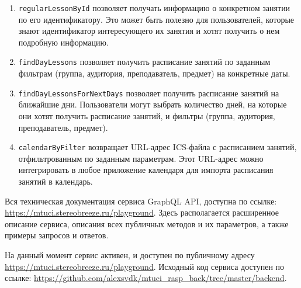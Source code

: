\begin{enumerate}
\item \texttt{regularLessonById} позволяет получать информацию о конкретном занятии по его идентификатору. Это может быть полезно для пользователей, которые знают идентификатор интересующего их занятия и хотят получить о нем подробную информацию.
\item \texttt{findDayLessons} позволяет получить расписание занятий по заданным фильтрам (группа, аудитория, преподаватель, предмет) на конкретные даты.
\item \texttt{findDayLessonsForNextDays} позволяет получить расписание занятий на ближайшие дни. Пользователи могут выбрать количество дней, на которые они хотят получить расписание занятий, и фильтры (группа, аудитория, преподаватель, предмет).
\item \texttt{calendarByFilter} возвращает URL-адрес ICS-файла с расписанием занятий, отфильтрованным по заданным параметрам. Этот URL-адрес можно интегрировать в любое приложение календаря для импорта расписания занятий в календарь.
\end{enumerate}

Вся техническая документация сервиса GraphQL API, доступна по ссылке:
\url{https://mtuci.stereobreeze.ru/playground}.
Здесь располагается расширенное описание сервиса, описания всех публичных методов и их параметров,
а также примеры запросов и ответов.

На данный момент сервис активен, и доступен по публичному адресу \url{https://mtuci.stereobreeze.ru/playground}.
Исходный код сервиса доступен по ссылке: \url{https://github.com/alexsvdk/mtuci_rasp_back/tree/master/backend}.
